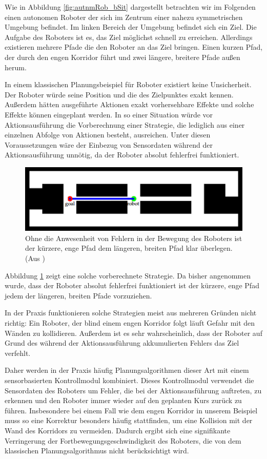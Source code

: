 \documentclass[a4paper]{IEEEtran}
\begin{document}
Wie in Abbildung \ref{fig:autnmRob_bSit} dargestellt betrachten wir im Folgenden einen autonomen Roboter der sich im Zentrum einer nahezu symmetrischen Umgebung befindet. Im linken Bereich der Umgebung befindet sich ein Ziel. Die Aufgabe des Roboters ist es, das Ziel möglichst schnell zu erreichen. Allerdings existieren mehrere Pfade die den Roboter an das Ziel bringen. Einen kurzen Pfad, der durch den engen Korridor führt und zwei längere, breitere Pfade außen herum.

In einem klassischen Planungsbeispiel für Roboter existiert keine Unsicherheit. Der Roboter würde seine Position und die des Zielpunktes exakt kennen. Außerdem hätten ausgeführte Aktionen exakt vorhersehbare Effekte und solche Effekte können eingeplant werden. In so einer Situation würde vor Aktionsausführung die Vorberechnung einer Strategie, die lediglich aus einer einzelnen Abfolge von Aktionen besteht, ausreichen. Unter diesen Voraussetzungen wäre der Einbezug von Sensordaten während der Aktionsausführung unnötig, da der Roboter absolut fehlerfrei funktioniert.

\begin{figure}[ht]
	\centering
	\includegraphics[scale=0.72]{images/autnmRobot_directPath.png}
	\caption{Ohne die Anwesenheit von Fehlern in der Bewegung des Roboters ist der kürzere, enge Pfad dem längeren, breiten Pfad klar überlegen. (Aus \cite{thrun2005probabilistic})}
	\label{fig:autnmRob_dirPath}
\end{figure}

Abbildung \ref{fig:autnmRob_dirPath} zeigt eine solche vorberechnete Strategie. Da bisher angenommen wurde, dass der Roboter absolut fehlerfrei funktioniert ist der kürzere, enge Pfad jedem der längeren, breiten Pfade vorzuziehen.

In der Praxis funktionieren solche Strategien meist aus mehreren Gründen nicht richtig: Ein Roboter, der blind einem engen Korridor folgt läuft Gefahr mit den Wänden zu kollidieren. Außerdem ist es sehr wahrscheinlich, dass der Roboter auf Grund des während der Aktionsausführung akkumulierten Fehlers das Ziel verfehlt.

Daher werden in der Praxis häufig Planungsalgorithmen dieser Art mit einem sensorbasierten Kontrollmodul kombiniert. Dieses Kontrollmodul verwendet die Sensordaten des Roboters um Fehler, die bei der Aktionsausführung auftreten, zu erkennen und den Roboter immer wieder auf den geplanten Kurs zurück zu führen. Insbesondere bei einem Fall wie dem engen Korridor in unserem Beispiel muss so eine Korrektur besonders häufig stattfinden, um eine Kollision mit der Wand des Korridors zu vermeiden. Dadurch ergibt sich eine signifikante Verringerung der Fortbewegungsgeschwindigkeit des Roboters, die von dem klassischen Planungsalgorithmus nicht berücksichtigt wird. 
\end{document}
